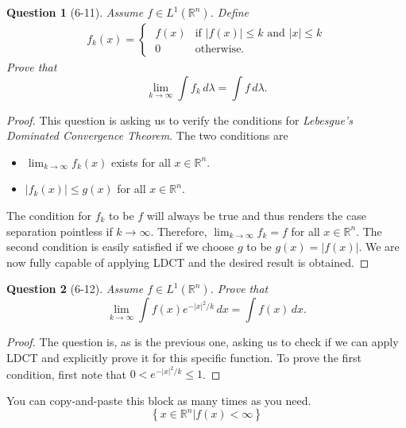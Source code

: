 \documentclass[11pt]{article}
\theoremstyle{quest}
\newtheorem*{question}{Question}
\newcommand{\R}{\mathbb{R}}
\begin{document}
\begin{question}[6-11]
  Assume $f \in L^{1}\left(\R^{n}\right)$. Define
  \begin{align*}
    f_{k}\left(x\right) = \begin{cases}\; f\left(x\right) & \text{if $|f\left(x\right)|\leq k$ and $|x| \leq k$} \\ \; 0 & \text{otherwise.}  \end{cases}
  \end{align*}
  Prove that
  $$
    \lim_{k\to\infty} \int f_{k}\,d\lambda = \int f\,d\lambda.
  $$
\end{question}
\begin{proof}
  This question is asking us to verify the conditions for \emph{Lebesgue's Dominated Convergence Theorem}. The two conditions are 
  \begin{itemize}
    \item $\lim_{k\to\infty} f_{k}\left(x\right)$ exists for all $x\in \R^{n}$.
    \item $|f_{k}\left(x\right)|\leq g\left(x\right)$ for all $x \in \R^{n}$.
  \end{itemize}
  The condition for $f_{k}$ to be $f$ will always be true and thus renders the case separation pointless if $k \to \infty$. Therefore, $\lim_{k\to\infty}f_{k} = f$ for all $x \in \R^{n}$. The second condition is easily satisfied if we choose $g$ to be $g\left(x\right) = |f\left(x\right)|$. We are now fully capable of applying LDCT and the desired result is obtained.
\end{proof}

\begin{question}[6-12]
  Assume $f \in L^{1}\left(\R^{n}\right)$. Prove that
  $$
    \lim_{k\to\infty}\int f\left(x\right)e^{-|x|^{2}/k}\,dx = \int f\left(x\right)\,dx .
  $$
\end{question}
\begin{proof}
  The question is, as is the previous one, asking us to check if we can apply LDCT and explicitly prove it for this specific function. To prove the first condition, first note that $0 < e^{-|x|^{2}/k} \leq 1$. 
\end{proof}

You can copy-and-paste this block as many times as you need.
$$
  \left\{x\in \R^{n}| f\left(x\right) < \infty\right\}
$$

\end{document}
